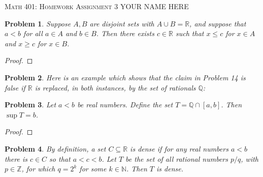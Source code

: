 \documentclass[12pt]{article}
\newtheorem{problem}{Problem}
\newcommand{\NN}{\ensuremath{\mathbb N}}
\newcommand{\QQ}{\ensuremath{\mathbb Q}}
\newcommand{\RR}{\ensuremath{\mathbb R}}
\newcommand{\ZZ}{\ensuremath{\mathbb Z}}
\begin{document}
\small
\noindent \textsc{Math 401: Homework Assignment 3} \hfill YOUR NAME HERE

\normalsize
\bigskip

\setcounter{problem}{13}


\begin{problem} %
Suppose $A,B$ are disjoint sets with $A\cup B = \RR$, and suppose that $a<b$ for all $a\in A$ and $b\in B$.  Then there exists $c\in\RR$ such that $x\le c$ for $x\in A$ and $x\ge c$ for $x\in B$.
\end{problem}


\begin{proof}
\end{proof}


\begin{problem} %
Here is an example which shows that the claim in Problem 14 is false if $\RR$ is replaced, in both instances, by the set of rationals $\QQ$:
\end{problem}


\begin{problem} %
Let $a<b$ be real numbers.  Define the set $T=\QQ \cap [a,b]$.  Then $\sup T = b$.
\end{problem}


\begin{proof}
\end{proof}


\begin{problem} %
By definition, a set $C\subseteq \RR$ is \emph{dense} if for any real numbers $a<b$ there is $c\in C$ so that $a<c<b$.  Let $T$ be the set of all rational numbers $p/q$, with $p\in\ZZ$, for which $q=2^k$ for some $k\in\NN$.  Then $T$ is dense.
\end{problem}

\end{document}
